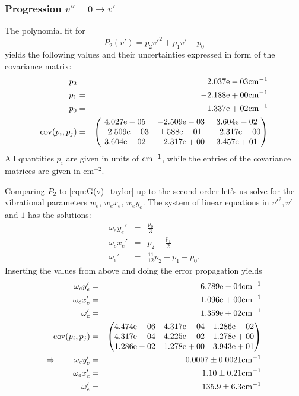 \subsubsection{Progression $v'' = 0 \rightarrow v'$}
The polynomial fit for 
\begin{equation}
    P_2(v') = p_2 {v'}^2 + p_1 v' + p_0
\end{equation}
yields the following values and their uncertainties expressed in form of 
the covariance matrix:
\begin{eqnarray}
    p_2 &=& 2.037\mathrm{e}-03 \mathrm{cm^{-1}}\\
    p_1 &=& -2.188\mathrm{e}+00 \mathrm{cm^{-1}}\\
    p_0 &=& 1.337\mathrm{e}+02 \mathrm{cm^{-1}}\\
    \mathrm{cov}(p_i, p_j) &=& 
    \begin{pmatrix}
        4.027\mathrm{e}-05 &-2.509\mathrm{e}-03 &3.604\mathrm{e}-02 \\
        -2.509\mathrm{e}-03 &1.588\mathrm{e}-01 &-2.317\mathrm{e}+00 \\
        3.604\mathrm{e}-02 &-2.317\mathrm{e}+00 &3.457\mathrm{e}+01 \\
    \end{pmatrix}
\end{eqnarray}
All quantities $p_i$ are given in units of $\mathrm{cm^{-1}}$, while the entries of the covariance 
matrices are given in $\mathrm{cm^{-2}}$.

Comparing $P_2$ to \eqref{eqn:G(v)_taylor} up to the second order let's us solve for 
the vibrational parameters $w_e$, $w_e x_e$, $w_e y_e$. The system of linear equations in 
${v'}^2, v'$ and $1$ has the solutions:
\begin{eqnarray}
    \omega_e y_e' &=& \frac{p_0}{3} \\
    \omega_e x_e' &=& p_2 - \frac{p_1}{2} \\
    \omega_e'     &=& \frac{11}{12}p_2 - p_1 + p_0.
\end{eqnarray}
Inserting the values from above and doing the error propagation yields 
\begin{eqnarray}
    \omega_e y_e' &=& 6.789\mathrm{e}-04 \mathrm{cm^{-1}} \nonumber \\
    \omega_e x_e' &=& 1.096\mathrm{e}+00 \mathrm{cm^{-1}} \nonumber \\
    \omega_e' &=& 1.359\mathrm{e}+02 \mathrm{cm^{-1}} \nonumber \\
    \mathrm{cov}(p_i, p_j) &=& 
    \begin{pmatrix}
        4.474\mathrm{e}-06 &4.317\mathrm{e}-04 &1.286\mathrm{e}-02 \\
        4.317\mathrm{e}-04 &4.225\mathrm{e}-02 &1.278\mathrm{e}+00 \\
        1.286\mathrm{e}-02 &1.278\mathrm{e}+00 &3.943\mathrm{e}+01 \\
    \end{pmatrix}
\\ \Rightarrow \qquad
    \omega_e y_e' &=& 0.0007 \pm 0.0021 \mathrm{cm^{-1}}\\
    \omega_e x_e' &=& 1.10 \pm 0.21 \mathrm{cm^{-1}}\\
    \omega_e' &=& 135.9 \pm 6.3 \mathrm{cm^{-1}}
\end{eqnarray} 

